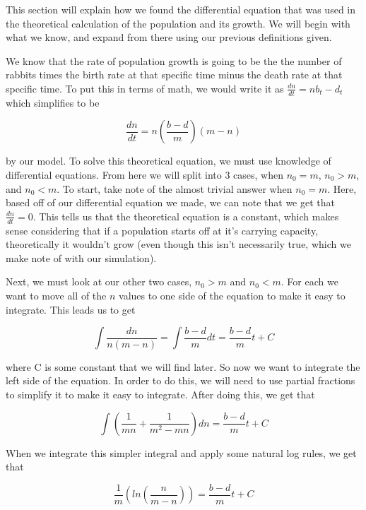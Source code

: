 \documentclass{article}\usepackage[]{graphicx}\usepackage[]{color}
\begin{document}
This section will explain how we found the differential equation that was used in the theoretical calculation of the population and its growth. We will begin with what we know, and expand from there using our previous definitions given.

We know that the rate of population growth is going to be the the number of rabbits times the birth rate at that specific time minus the death rate at that specific time. To put this in terms of math, we would write it as \(\frac{dn}{dt} = nb_t-d_t\) which simplifies to be 

\begin{equation}
\frac{dn}{dt} = n(\frac{b-d}{m})(m-n) 
\end{equation}

by our model. To solve this theoretical equation, we must use knowledge of differential equations. From here we will split into 3 cases, when \(n_0 =m\), \(n_0 > m\), and \(n_0 < m\). To start, take note of the almost trivial answer when \(n_0 = m\). Here, based off of our differential equation we made, we can note that we get that \(\frac{dn}{dt} = 0\). This tells us that the theoretical equation is a constant, which makes sense considering that if a population starts off at it's carrying capacity, theoretically it wouldn't grow (even though this isn't necessarily true, which we make note of with our simulation).

Next, we must look at our other two cases, \(n_0 > m\) and \(n_0 < m\). For each we want to move all of the \(n\) values to one side of the equation to make it easy to integrate. This leads us to get 

\begin{equation}
\int \frac{dn}{n(m-n)} = \int \frac{b-d}{m} dt = \frac{b-d}{m} t + C
\end{equation}

where C is some constant that we will find later. So now we want to integrate the left side of the equation. In order to do this, we will need to use partial fractions to simplify it to make it easy to integrate. After doing this, we get that 

\begin{equation}
\int(\frac{1}{mn}+\frac{1}{m^2-mn})dn = \frac{b-d}{m} t + C
\end{equation}

When we integrate this simpler integral and apply some natural log rules, we get that 

\begin{equation}
\frac{1}{m}(ln(\frac{n}{m-n})) = \frac{b-d}{m} t + C
\end{equation}
\end{document}
